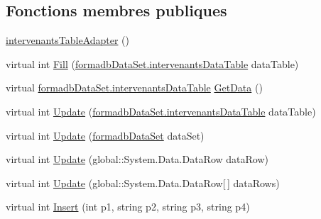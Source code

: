 \subsection*{Fonctions membres publiques}
\begin{DoxyCompactItemize}
\item 
\hyperlink{classforma_1_1formadb_data_set_table_adapters_1_1intervenants_table_adapter_ae470557f204a9da5acf4f8a94727b78a}{intervenants\+Table\+Adapter} ()
\item 
virtual int \hyperlink{classforma_1_1formadb_data_set_table_adapters_1_1intervenants_table_adapter_a70007d75053208258cc2588433fdbf15}{Fill} (\hyperlink{classforma_1_1formadb_data_set_1_1intervenants_data_table}{formadb\+Data\+Set.\+intervenants\+Data\+Table} data\+Table)
\item 
virtual \hyperlink{classforma_1_1formadb_data_set_1_1intervenants_data_table}{formadb\+Data\+Set.\+intervenants\+Data\+Table} \hyperlink{classforma_1_1formadb_data_set_table_adapters_1_1intervenants_table_adapter_a292f4a930fb709a4cea5c23273a3bc35}{Get\+Data} ()
\item 
virtual int \hyperlink{classforma_1_1formadb_data_set_table_adapters_1_1intervenants_table_adapter_ad22fb8b6e30061bcb131d922ce91403b}{Update} (\hyperlink{classforma_1_1formadb_data_set_1_1intervenants_data_table}{formadb\+Data\+Set.\+intervenants\+Data\+Table} data\+Table)
\item 
virtual int \hyperlink{classforma_1_1formadb_data_set_table_adapters_1_1intervenants_table_adapter_af3f7d681d6162bed5ba545878a07f185}{Update} (\hyperlink{classforma_1_1formadb_data_set}{formadb\+Data\+Set} data\+Set)
\item 
virtual int \hyperlink{classforma_1_1formadb_data_set_table_adapters_1_1intervenants_table_adapter_a3d8119fa989843e3fc1bf1ec5b4e0cb4}{Update} (global\+::\+System.\+Data.\+Data\+Row data\+Row)
\item 
virtual int \hyperlink{classforma_1_1formadb_data_set_table_adapters_1_1intervenants_table_adapter_a6487decc4be1477f72cd160891a51cd8}{Update} (global\+::\+System.\+Data.\+Data\+Row\mbox{[}$\,$\mbox{]} data\+Rows)
\item 
virtual int \hyperlink{classforma_1_1formadb_data_set_table_adapters_1_1intervenants_table_adapter_a64c6d7898297fb1a036df53fd26f76c6}{Insert} (int p1, string p2, string p3, string p4)
\end{DoxyCompactItemize}
